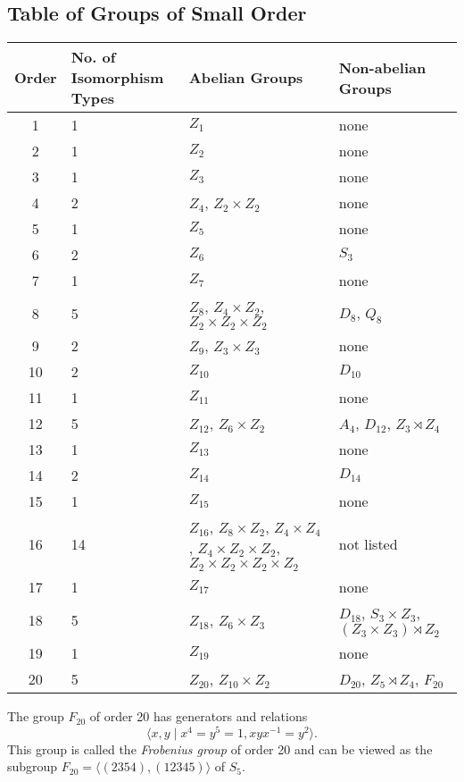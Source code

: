 \documentclass[../main]{subfiles}
\begin{document}
\subsection{Table of Groups of Small Order}


\begin{center}
\begin{tabular}{|c|C{4cm}|C{4cm}|C{4cm}|}\hline
Order & No. of Isomorphism Types & Abelian Groups & Non-abelian Groups\\ & 1 & $Z_1$ & none\\ & 1 & $Z_2$ & none\\ & 1 & $Z_3$ & none\\ & 2 & $Z_4$, $Z_2 \times Z_2$ & none\\ & 1 & $Z_5$ & none\\ & 2 & $Z_6$ & $S_3$\\ & 1 & $Z_7$ & none\\ & 5 & $Z_8$, $Z_4 \times Z_2$, $Z_2 \times Z_2 \times Z_2$ & $D_8$, $Q_8$\\ & 2 & $Z_9$, $Z_3 \times Z_3$ & none\\ & 2 & $Z_{10}$ & $D_{10}$\\ & 1 & $Z_{11}$ & none\\ & 5 & $Z_{12}$, $Z_6 \times Z_2$ & $A_4$, $D_{12}$, $Z_3 \rtimes Z_4$\\ & 1 & $Z_{13}$ & none\\ & 2 & $Z_{14}$ & $D_{14}$\\ & 1 & $Z_{15}$ & none\\ & 14 & $Z_{16}$, $Z_8 \times Z_2$, $Z_4 \times Z_4$, $Z_4 \times Z_2 \times Z_2$, $Z_2 \times Z_2 \times Z_2 \times Z_2$ & not listed\\ & 1 & $Z_{17}$ & none\\ & 5 & $Z_{18}$, $Z_6 \times Z_3$ & $D_{18}$, $S_3 \times Z_3$, $(Z_3 \times Z_3) \rtimes Z_2$\\ & 1 & $Z_{19}$ & none\\ & 5 & $Z_{20}$, $Z_{10} \times Z_2$ & $D_{20}$, $Z_5 \rtimes Z_4$, $F_{20}$\\\hline
\end{tabular}
\end{center}


\begin{nt}
 The group $F_{20}$ of order 20 has generators and relations 
 \[ \langle x,y \mid x^4 = y^5 = 1, xyx^{-1} = y^2 \rangle. \]
 This group is called the \textit{Frobenius group} of order 20 and can be viewed as the subgroup $F_{20} = \langle (2354), (12345) \rangle$ of $S_5$.
\end{nt}
\end{document}
